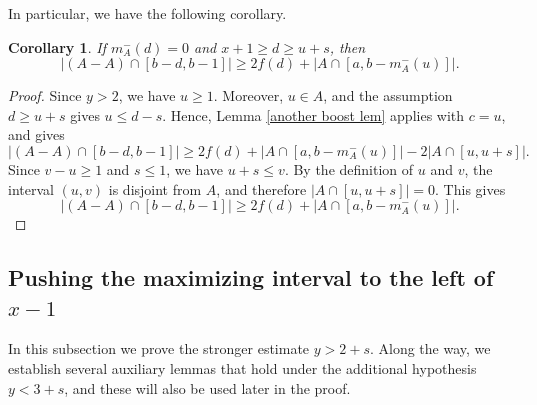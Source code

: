 \documentclass[11pt,reqno]{amsart}
\newtheorem{cor}[thm]{Corollary}
\theoremstyle{definition}
\def\F#1{f(#1)}
\begin{document}
In particular, we have the following corollary. 

\begin{cor} \label{another boost cor}
    If $m_A^-(d) = 0$ and $x+1\geq d\geq u + s$, then
    \begin{equation*}
        |(A - A)\cap [b - d, b - 1]|\geq 2\F{d} + |A\cap [a, b - m_A^-(u)]|. 
    \end{equation*}
\end{cor}
\begin{proof}
Since $y>2$, we have $u\geq 1$. Moreover, $u\in A$, and the assumption $d\geq u+s$ gives $u\leq d-s$. Hence,   Lemma \ref{another boost lem} applies with $c=u$, and gives
$$
|(A - A)\cap [b - d, b - 1]|
\geq
2\F{d} + |A\cap [a, b - m_A^-(u)]| - 2|A\cap [u,u+s]|.
$$
Since $v-u\geq 1$ and $s\leq 1$, we have $u+s\leq v$. By the definition of $u$ and $v$, the interval $(u,v)$ is disjoint from $A$, and therefore $|A\cap [u,u+s]|=0$. This gives
$$
|(A - A)\cap [b - d, b - 1]|
\geq
2\F{d} + |A\cap [a, b - m_A^-(u)]|.
$$
\end{proof}
\subsection{Pushing the maximizing interval to the left of $x-1$}

In this subsection we prove the stronger estimate $y>2+s$. Along the way, we establish several auxiliary lemmas that hold under the additional hypothesis $y<3+s$, and these will also be used later in the proof.
\end{document}
